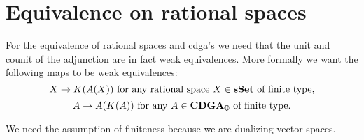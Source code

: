 


\section{Equivalence on rational spaces}
For the equivalence of rational spaces and cdga's we need that the unit and counit of the adjunction are in fact weak equivalences. More formally we want the following maps to be weak equivalences:
$$ X \to K(A(X)) \text{ for any rational space $X \in \mathbf{s{\mathbf{Set}}}$ of finite type}, $$
$$ A \to A(K(A)) \text{ for any $A \in \mathbf{CDGA}_{\mathbb{Q}}$ of finite type}. $$

We need the assumption of finiteness because we are dualizing vector spaces.

